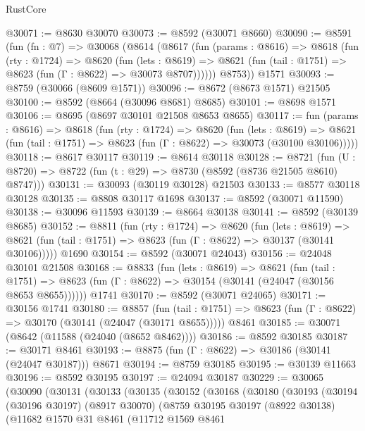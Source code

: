 \begin{lexlean}{RustCore}
\begin{coremodule}
@30071 := @8630 @30070
@30073 := @8592 (@30071 @8660)
@30090 := @8591
    (fun (fn : @7) =>
    @30068
      (@8614
        (@8617
          (fun (params : @8616) =>
          @8618
            (fun (rty : @1724) =>
            @8620
              (fun (lets : @8619) =>
              @8621 (fun (tail : @1751) => @8623 (fun (Γ : @8622) => @30073 @8707))))))
        @8753))
    @1571
@30093 := @8759 (@30066 (@8609 @1571))
@30096 := @8672 (@8673 @1571) @21505
@30100 := @8592 (@8664 (@30096 @8681) @8685)
@30101 := @8698 @1571
@30106 := @8695 (@8697 @30101 @21508 @8653 @8655)
@30117 := fun (params : @8616) =>
  @8618
    (fun (rty : @1724) =>
    @8620
      (fun (lets : @8619) =>
      @8621 (fun (tail : @1751) => @8623 (fun (Γ : @8622) => @30073 (@30100 @30106)))))
@30118 := @8617 @30117
@30119 := @8614 @30118
@30128 := @8721
    (fun (U : @8720) => @8722 (fun (t : @29) => @8730 (@8592 (@8736 @21505 @8610) @8747)))
@30131 := @30093 (@30119 @30128) @21503
@30133 := @8577 @30118 @30128
@30135 := @8808 @30117 @1698
@30137 := @8592 (@30071 @11590)
@30138 := @30096 @11593
@30139 := @8664 @30138
@30141 := @8592 (@30139 @8685)
@30152 := @8811
    (fun (rty : @1724) =>
    @8620
      (fun (lets : @8619) =>
      @8621 (fun (tail : @1751) => @8623 (fun (Γ : @8622) => @30137 (@30141 @30106)))))
    @1690
@30154 := @8592 (@30071 @24043)
@30156 := @24048 @30101 @21508
@30168 := @8833
    (fun (lets : @8619) =>
    @8621
      (fun (tail : @1751) =>
      @8623 (fun (Γ : @8622) => @30154 (@30141 (@24047 (@30156 @8653 @8655))))))
    @1741
@30170 := @8592 (@30071 @24065)
@30171 := @30156 @1741
@30180 := @8857
    (fun (tail : @1751) => @8623 (fun (Γ : @8622) => @30170 (@30141 (@24047 (@30171 @8655)))))
    @8461
@30185 := @30071 (@8642 (@11588 (@24040 (@8652 @8462))))
@30186 := @8592 @30185
@30187 := @30171 @8461
@30193 := @8875 (fun (Γ : @8622) => @30186 (@30141 (@24047 @30187))) @8671
@30194 := @8759 @30185
@30195 := @30139 @11663
@30196 := @8592 @30195
@30197 := @24094 @30187
@30229 := @30065
    (@30090
      (@30131
        (@30133
          (@30135
            (@30152
              (@30168
                (@30180
                  (@30193
                    (@30194
                      (@30196 @30197)
                      (@8917 @30070)
                      (@8759
                        @30195
                        @30197
                        (@8922 @30138)
                        (@11682
                          @1570
                          @31
                          @8461
                          (@11712
                            @1569
                            @8461

\end{coremodule}
\end{lexlean}
